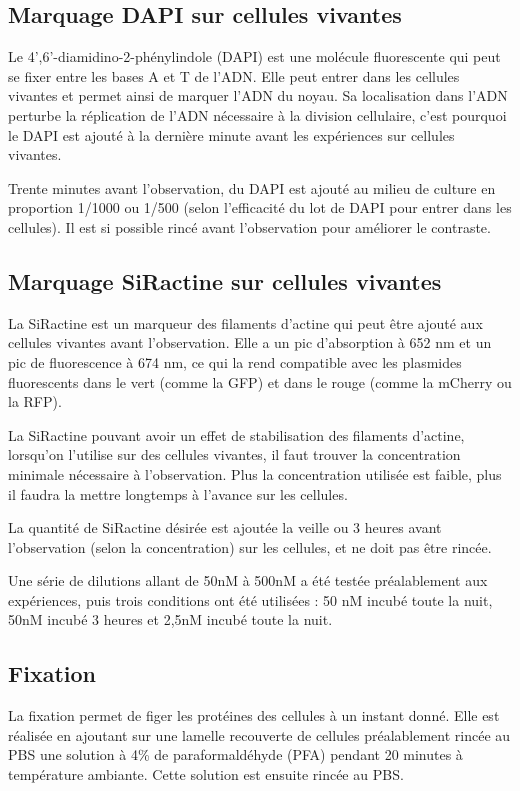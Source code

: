 	\subsection{Marquage DAPI sur cellules vivantes}
	
	Le  4',6'-diamidino-2-phénylindole (DAPI) est une molécule fluorescente qui peut se fixer entre les bases A et T de l'ADN. Elle peut entrer dans les cellules vivantes et permet ainsi de marquer l'ADN du noyau. Sa localisation dans l'ADN perturbe la réplication de l'ADN nécessaire à la division cellulaire, c'est pourquoi le DAPI est ajouté à la dernière minute avant les expériences sur cellules vivantes. 
	
	Trente minutes avant l'observation, du DAPI est ajouté au milieu de culture en proportion 1/1000 ou 1/500 (selon l'efficacité du lot de DAPI pour entrer dans les cellules). Il est si possible rincé avant l'observation pour améliorer le contraste. 
	
	\subsection{Marquage SiRactine sur cellules vivantes}

	La SiRactine est un marqueur des filaments d'actine qui peut être ajouté aux cellules vivantes avant l'observation. Elle a un pic d'absorption à 652 nm et un pic de fluorescence à 674 nm, ce qui la rend compatible avec les plasmides fluorescents dans le vert (comme la GFP) et dans le rouge (comme la mCherry ou la RFP). 
	
	La SiRactine pouvant avoir un effet de stabilisation des filaments d'actine, lorsqu'on l'utilise sur des cellules vivantes, il faut trouver la concentration minimale nécessaire à l'observation. Plus la concentration utilisée est faible, plus il faudra la mettre longtemps à l'avance sur les cellules. 
	
	La quantité de SiRactine désirée est ajoutée la veille ou 3 heures avant l'observation (selon la concentration) sur les cellules, et ne doit pas être rincée. 
	
	Une série de dilutions allant de 50nM à 500nM a été testée préalablement aux expériences, puis trois conditions ont été utilisées : 50 nM incubé toute la nuit, 50nM incubé 3 heures et 2,5nM incubé toute la nuit. 
	
	
	
	\subsection{Fixation}
	La fixation permet de figer les protéines des cellules à un instant donné. Elle est réalisée en ajoutant sur une lamelle recouverte de cellules préalablement rincée au PBS une solution à 4\% de paraformaldéhyde (PFA) pendant 20 minutes à température ambiante. Cette solution est ensuite rincée au PBS. 
	
